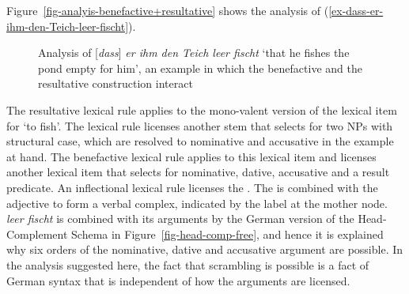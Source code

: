Figure~\vref{fig-analyis-benefactive+resultative} shows the analysis of (\ref{ex-dass-er-ihm-den-Teich-leer-fischt}).
\begin{figure}[b]
\caption{Analysis of [\emph{dass}] \emph{er ihm den Teich leer fischt} `that he fishes the pond empty for him', an example in which the benefactive
  and the resultative construction interact}\label{fig-analyis-benefactive+resultative}
\end{figure}
The resultative lexical rule applies to the mono-valent version of the lexical item for 
`to fish'. The lexical rule licenses another stem that selects for two NPs with structural case, which are
resolved to nominative and accusative in the example at hand. The benefactive lexical rule applies
to this lexical item and licenses another lexical item that selects for nominative, dative,
accusative and a result predicate. An inflectional lexical rule licenses the \vnull. The \vnull is
combined with the adjective to form a verbal complex, indicated by the label \vnull at the mother
node. \emph{leer fischt} is combined with its arguments by the German version of the Head-Complement
Schema in Figure~\ref{fig-head-comp-free}, and hence it is explained why six orders of the nominative, dative and accusative argument
are possible. In the analysis suggested here, the fact that scrambling is possible is a fact of German syntax that is independent of
how the arguments are licensed.

